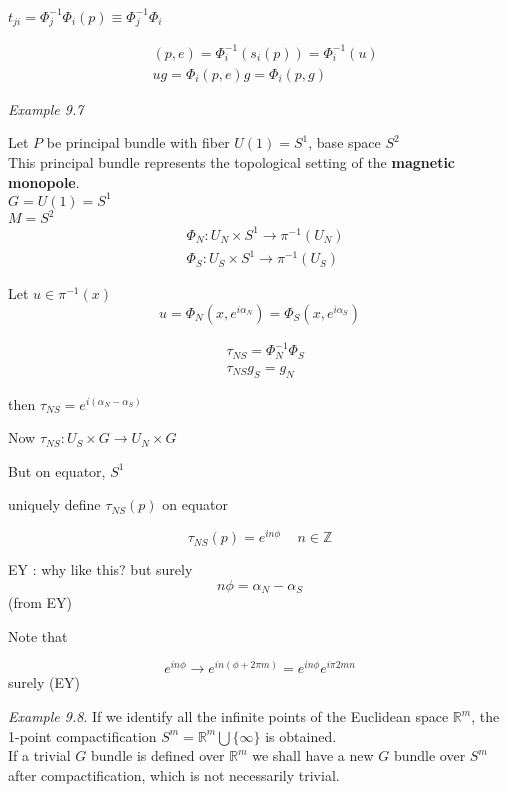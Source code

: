 \documentclass[twoside]{amsart}
\begin{document}
$t_{ji} = \Phi_j^{-1}\Phi_i(p) \equiv \Phi_j^{-1} \Phi_i$

\[
\begin{aligned}
  & (p,e) = \Phi_i^{-1}(s_i(p)) = \Phi_i^{-1}(u) \\ 
  &  ug = \Phi_i(p,e)g = \Phi_i(p,g)
\end{aligned}
\]



\emph{Example 9.7}

Let $P$ be principal bundle with fiber $U(1) = S^1$, base space $S^2$ \\
This principal bundle represents the topological setting of the \textbf{magnetic monopole}.   \\

$G = U(1) = S^1$ \\
$M=S^2$ \\

\[
\begin{aligned}
  & \Phi_N : U_N \times S^1 \to \pi^{-1}{ (U_N) } \\ 
  & \Phi_S : U_S \times S^1 \to \pi^{-1}{ (U_S) } 
\end{aligned}
\]

Let $u\in \pi^{-1}{ (x)}$ 
\[
u = \Phi_N(x,e^{i \alpha_N} ) = \Phi_S( x, e^{ i \alpha_S } )
\]

\[
\begin{aligned}
  & \tau_{NS} = \Phi_N^{-1} \Phi_S \\ 
  & \tau_{NS}g_S = g_N
\end{aligned}
\]

then $\tau_{NS} = e^{ i (\alpha_N - \alpha_S)}$

Now $\tau_{NS}: U_S \times G \to U_N \times G$  

But on equator, $S^1$

uniquely define $\tau_{NS}(p)$ on equator 

\[
\tau_{NS}(p) = e^{i n \phi } \quad \, n \in \mathbb{Z}
\]

EY : why like this? but surely
\[
n\phi = \alpha_N - \alpha_S 
\]
(from EY)

Note that 

\[
e^{in\phi}  \to e^{ i n (\phi + 2 \pi m ) } = e^{in \phi } e^{i \pi 2mn }
\]
surely (EY)


\emph{Example 9.8}. If we identify all the infinite points of the Euclidean space $\mathbb{R}^m$, the 1-point compactification $S^m = \mathbb{R}^m \bigcup \lbrace \infty \rbrace$ is obtained.  \\
If a trivial $G$ bundle is defined over $\mathbb{R}^m$ we shall have a new $G$ bundle over $S^m$ after compactification, which is not necessarily trivial.  
\end{document}
